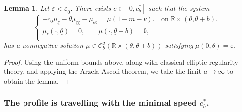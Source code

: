 \documentclass[11pt]{article}    %
\newtheorem{lemma}[theorem]{Lemma}
\newcommand{\R}{\mathbb{R}}
\newcommand{\eps}{\varepsilon}
\begin{document}
\begin{lemma}\label{lem:convslab}
Let $\underline\eps < \underline\eps_0$. There exists $c \in \left[ 0 , c_b^* \right]$ such that the system
\begin{equation}\label{convslab2}
\begin{cases}
- c_0 \mu_{\xi} - \theta \mu_{\xi\xi} - \mu_{\theta\theta} = \mu (1 - m - \nu),  & \text{on } \R\times(\underline\theta,\underline\theta+b), \\
 \mu_\theta(\cdot,\underline\theta) = 0, \qquad \mu(\cdot, \underline\theta + b) = 0, \\
\end{cases}
\end{equation}
has a nonnegative solution $\mu \in \mathcal{C}_b^2\left( \R \times (\underline\theta,\underline\theta + b)\right)$ satisfying $\mu(0,\underline\theta) = \underline\eps$. 
\end{lemma}
\begin{proof}
Using the uniform bounds above, along with classical elliptic regularity theory, and applying the Arzela-Ascoli theorem, we take the limit $a\to \infty$ to obtain the lemma.
\end{proof}

\subsubsection*{The profile is travelling with the minimal speed $c_b^*$.}
\end{document}
